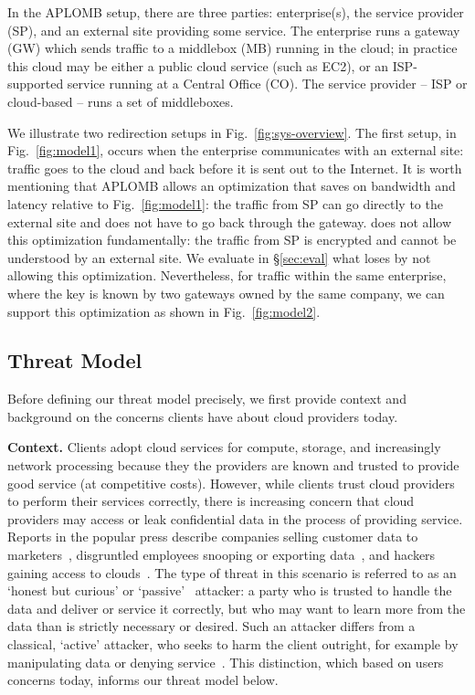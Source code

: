 In the APLOMB setup, there are three parties: enterprise(s), the service provider (SP), and an external site providing
some service. The enterprise runs a gateway (GW) which sends traffic to a middlebox (MB) running in the cloud; in practice this cloud may be either a public cloud service (such as EC2), or an ISP-supported service running at a Central Office (CO).
The service provider -- ISP or cloud-based -- runs a set of middleboxes. 

We illustrate two redirection setups in Fig.~\ref{fig:sys-overview}.  The first setup, in Fig.~\ref{fig:model1},  occurs when the enterprise communicates with an external site: traffic goes to the cloud and back before it is sent out to the Internet. 
It is worth mentioning that APLOMB allows an optimization that saves on bandwidth and latency relative to Fig.~\ref{fig:model1}: the traffic from SP can go directly to the external site and does not have to go back through the gateway. \sys does not allow this optimization fundamentally: the traffic from SP is encrypted and cannot be understood by an external site. We evaluate in \S\ref{sec:eval} what \sys loses by not allowing this optimization. 
Nevertheless, for traffic within the same enterprise, where the key is known by two gateways owned by the same company, we can support this optimization as shown in Fig.~\ref{fig:model2}.




\subsection{Threat Model}

Before defining our threat model precisely, we first provide context and background on the concerns clients have about cloud providers today.

{\bf Context.} 
  Clients adopt cloud services for compute, storage, and increasingly network processing because they the providers are known and trusted to provide good service (at competitive costs). 
  However, while clients trust cloud providers to perform their services correctly, there is increasing concern that cloud providers may access or leak confidential data in the process of providing service.
  Reports in the popular press describe companies selling customer data to marketers~\cite{example}, disgruntled employees snooping or exporting data~\cite{something}, and hackers gaining access to clouds~\cite{somethingelse}.
  The type of threat in this scenario is referred to as an `honest but curious' or `passive'~\cite{goodrich} attacker: a party who is trusted to handle the data and deliver or service it correctly, but who may want to learn more from the data than is strictly necessary or desired.
  Such an attacker differs from a classical, `active' attacker, who seeks to harm the client outright, for example by manipulating data or denying service~\cite{goodrich}.
  This distinction, which based on users concerns today, informs our threat model below. 

